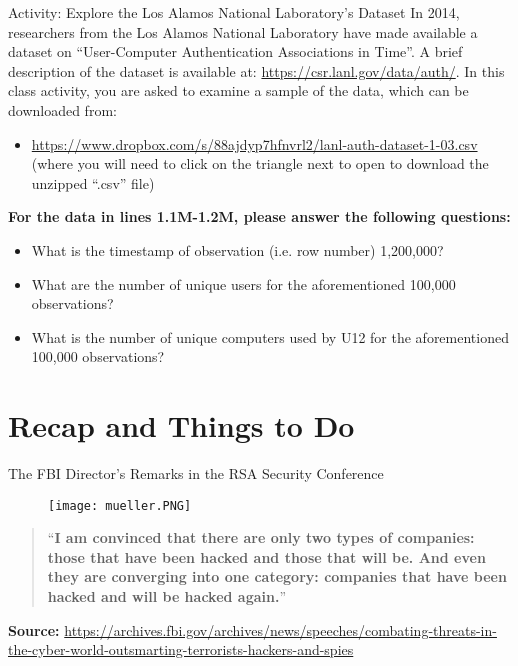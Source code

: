 \documentclass[aspectratio=169]{beamer} %
\begin{document}
\begin{frame}{Activity: Explore the Los Alamos National Laboratory's Dataset}
	In 2014, researchers from the Los Alamos National Laboratory have made available a dataset on ``User-Computer Authentication Associations in Time''. A brief description of the dataset is available at: \url{https://csr.lanl.gov/data/auth/}. In this class activity, you are asked to examine a sample of the data, which can be downloaded from:
	\begin{itemize}
		\item \url{https://www.dropbox.com/s/88ajdyp7hfnvrl2/lanl-auth-dataset-1-03.csv} (where you will need to click on the triangle next to open to download the unzipped ``.csv'' file)
	\end{itemize} 
	
	\vspace{\baselineskip}
	
	\textbf{For the data in lines 1.1M-1.2M, please answer the following questions:}
	\begin{itemize}
		\item What is the timestamp of observation (i.e. row number) 1,200,000? %
		\item What are the number of unique users for the aforementioned 100,000 observations?
		\item What is the number of unique computers used by U12 for the aforementioned 100,000 observations?
	\end{itemize}
\end{frame}

\section{Recap and Things to Do}

\begin{frame}{The FBI Director's Remarks in the RSA Security Conference}
	
	\begin{figure}
		\centering
		\texttt{[image: mueller.PNG]}
	\end{figure}
	
	\begin{quotation}
		\noindent ``\textbf{I am convinced that there are only two types of companies: those that have been hacked and those that will be. And even they are converging into one category: companies that have been hacked and will be hacked again.}''  
	\end{quotation}

	\vspace{0.75\baselineskip}

	\scriptsize{\textbf{Source:} \url{https://archives.fbi.gov/archives/news/speeches/combating-threats-in-the-cyber-world-outsmarting-terrorists-hackers-and-spies}}
\end{frame}
\end{document}
